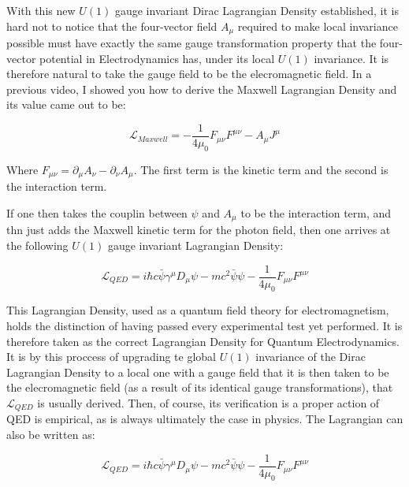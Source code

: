 \documentclass[a4]{article}
\begin{document}
    With this new $U(1)$ gauge invariant Dirac Lagrangian Density established, it is hard not
    to notice that the four-vector field $A_{\mu}$ required to make local invariance possible must have
    exactly the same gauge transformation property that the four-vector potential in Electrodynamics
    has, under its local $U(1)$ invariance. It is therefore natural to take the gauge field to be the
    elecromagnetic field. In a previous video, I showed you how to derive the Maxwell Lagrangian Density
    and its value came out to be:

    \begin{equation}
        \mathcal{L}_{Maxwell} = - \frac{1}{4 \mu_{0}} F_{\mu \nu} F^{\mu \nu} - A_{\mu} J^{\mu}
    \end{equation}

    Where $F_{\mu \nu} = \partial_{\mu} A_{\nu} - \partial_{\nu} A_{\mu}$. The first term is the kinetic
    term and the second is the interaction term.

    If one then takes the couplin between $\psi$ and $A_{\mu}$ to be the interaction term, and thn just adds
    the Maxwell kinetic term for the photon field, then one arrives at the following $U(1)$ gauge invariant
    Lagrangian Density:

    \begin{equation}
        \mathcal{L}_{QED} = i \hbar c \bar{\psi} \gamma^{\mu} D_{\mu} \psi - m c^{2} \bar{\psi} \psi - \frac{1}{4 \mu_{0}} F_{\mu \nu} F^{\mu \nu}
    \end{equation}

    This Lagrangian Density, used as a quantum field theory for electromagnetism, holds the distinction of having
    passed every experimental test yet performed. It is therefore taken as the correct Lagrangian Density for
    Quantum Electrodynamics. It is by this proccess of upgrading te global $U(1)$ invariance of the Dirac Lagrangian
    Density to a local one with a gauge field that it is then taken to be the elecromagnetic field (as a result of its
    identical gauge transformations), that $\mathcal{L}_{QED}$ is usually derived. Then, of course, its verification
    is a proper action of QED is empirical, as is always ultimately the case in physics. The Lagrangian can also be
    written as:

    \begin{equation}
        \mathcal{L}_{QED} = i \hbar c \bar{\psi} \gamma^{\mu} D_{\mu} \psi - m c^{2} \bar{\psi} \psi - \frac{1}{4 \mu_{0}} F_{\mu \nu} F^{\mu \nu}
    \end{equation}
\end{document}
